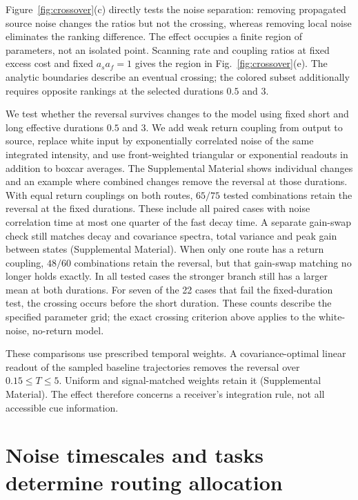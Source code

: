 \documentclass[aps,10pt,onecolumn,superscriptaddress,nofootinbib,longbibliography,
  amsmath,amssymb,floatfix]{revtex4-2}
\begin{document}
Figure~\ref{fig:crossover}(c) directly tests the noise separation:
removing propagated source noise changes the ratios but not the
crossing, whereas removing local noise eliminates the ranking
difference. The effect occupies a finite region of parameters,
not an isolated point. Scanning rate and coupling ratios at fixed
excess cost and fixed \(a_s a_f=1\) gives the region in
Fig.~\ref{fig:crossover}(e). The analytic boundaries describe an
eventual crossing; the colored subset additionally requires opposite
rankings at the selected durations \(0.5\) and \(3\).

We test whether the reversal survives changes to the model
using fixed short and long effective durations \(0.5\) and \(3\).
We add weak return coupling from output to source, replace
white input by exponentially correlated noise of the same
integrated intensity, and use front-weighted triangular or
exponential readouts in addition to boxcar averages.
The Supplemental Material shows individual changes and an
example where combined changes remove the reversal at those
durations. With equal return couplings on both routes, \(65/75\)
tested combinations retain the reversal at the fixed durations.
These include all paired cases with noise correlation time at most
one quarter of the fast decay time. A separate gain-swap check
still matches decay and covariance spectra, total variance and
peak gain between states (Supplemental Material). When only one
route has a return coupling, \(48/60\) combinations retain the
reversal, but that gain-swap matching no longer holds exactly.
In all tested cases the stronger branch
still has a larger mean at both durations. For seven of the
22 cases that fail the fixed-duration test, the crossing
occurs before the short duration. These counts describe the
specified parameter grid; the exact crossing criterion above
applies to the white-noise, no-return model.

These comparisons use prescribed temporal weights. A covariance-optimal
linear readout of the sampled baseline trajectories removes the
reversal over \(0.15\le T\le5\). Uniform and signal-matched
weights retain it (Supplemental Material). The effect therefore
concerns a receiver's integration rule, not all accessible cue information.

\FloatBarrier
\section{Noise timescales and tasks determine routing allocation}
\label{sec:allocation}
\end{document}

